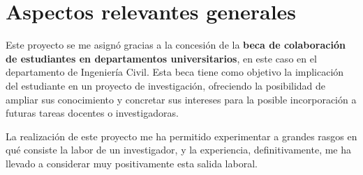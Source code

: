 \section{Aspectos relevantes generales}

Este proyecto se me asignó gracias a la concesión de la \textbf{beca de colaboración de estudiantes en departamentos universitarios}, en este caso en el departamento de Ingeniería Civil. Esta beca tiene como objetivo la implicación del estudiante en un proyecto de investigación, ofreciendo la posibilidad de ampliar sus conocimiento y concretar sus intereses para la posible incorporación a futuras tareas docentes o investigadoras. 

La realización de este proyecto me ha permitido experimentar a grandes rasgos en qué consiste la labor de un investigador, y la experiencia, definitivamente, me ha llevado a considerar muy positivamente esta salida laboral. 



